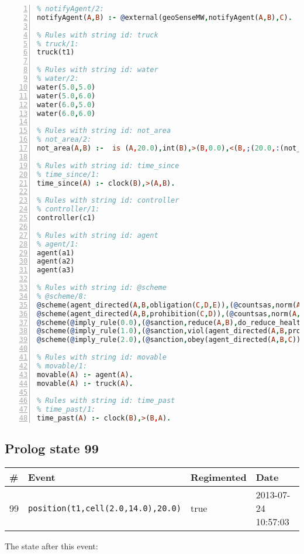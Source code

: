 \documentclass[11pt]{article}\usepackage[utf8]{inputenc}\usepackage{geometry}
\begin{document}
\begin{lstlisting}[language=Prolog, numbers=left]
% Rules with string id: notifyAgent
% notifyAgent/2:
notifyAgent(A,B) :- @external(geoSenseMW,notifyAgent(A,B),C).

% Rules with string id: truck
% truck/1:
truck(t1)

% Rules with string id: water
% water/2:
water(5.0,5.0)
water(5.0,6.0)
water(6.0,5.0)
water(6.0,6.0)

% Rules with string id: not_area
% not_area/2:
not_area(A,B) :-  is (A,20.0),int(B),>(B,0.0),<(B,;(20.0,:(not_area(A,B), is (-(B),20.0)))),int(A),>(A,0.0),<(A,;(20.0,:(area(A,B),-(int(A))))),int(B),>(A,0.0),>(B,0.0),<(A,21.0),<(B,21.0).

% Rules with string id: time_since
% time_since/1:
time_since(A) :- clock(B),>(A,B).

% Rules with string id: controller
% controller/1:
controller(c1)

% Rules with string id: agent
% agent/1:
agent(a1)
agent(a2)
agent(a3)

% Rules with string id: @scheme
% @scheme/8:
@scheme(agent_directed(A,B,obligation(C,D,E)),(@countsas,norm(A,B,F,obligation(C,D,E)),F),false,(listTrue(C)),(time_past(D)),false,[plus(viol(agent_directed(A,B,obligation(C,D,E))))|[]],[plus(obey(agent_directed(A,B,obligation(C,D,E))))|[]])
@scheme(agent_directed(A,B,prohibition(C,D)),(@countsas,norm(A,B,E,prohibition(C,D)),E),(listTrue(C)),false,(false),false,[plus(viol(agent_directed(A,B,prohibition(C,D))))|[]],[plus(obey(agent_directed(A,B,prohibition(C,D))))|[]])
@scheme(@imply_rule(0.0),(@sanction,reduce(A,B),do_reduce_health(A,B),notifyAgent(A,changed(status))),true,false,false,false,[min(reduce(A,B))|[]],[])
@scheme(@imply_rule(1.0),(@sanction,viol(agent_directed(A,B,prohibition(C,D))),do_sanction(D)),true,false,false,false,[min(viol(agent_directed(A,B,prohibition(C,D))))|[]],[])
@scheme(@imply_rule(2.0),(@sanction,obey(agent_directed(A,B,C))),true,false,false,false,[min(obey(agent_directed(A,B,C)))|[]],[])

% Rules with string id: movable
% movable/1:
movable(A) :- agent(A).
movable(A) :- truck(A).

% Rules with string id: time_past
% time_past/1:
time_past(A) :- clock(B),>(B,A).

\end{lstlisting}
\clearpage 
\subsection{Prolog state 99}
\begin{table}[ht]
\centering 
\begin{tabular}{l l l l} 
\textbf{\#} & \textbf{Event} & \textbf{Regimented} & \textbf{Date} \\ [0.5ex] 
\hline
99&\texttt{position(t1,cell(2.0,14.0),20.0)}&true&2013-07-24 10:57:03\\ [1ex] \hline\end{tabular}
\end{table}
The state after this event:
\end{document}
